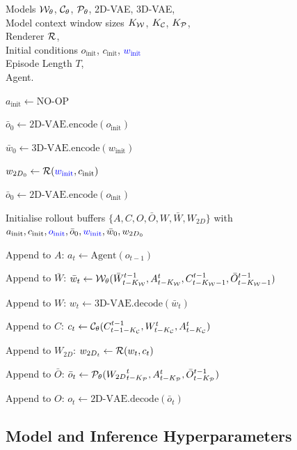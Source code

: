 \documentclass{article}
\theoremstyle{plain}
\theoremstyle{definition}
\theoremstyle{remark}
\newcommand{\ColorState}[2]{\State {\color{#1}#2}}
\newlength{\algleftcol}
\newcommand{\AlgLeftBox}[1]{%
  \parbox[t]{\algleftcol}{\raggedright\strut\ignorespaces#1\unskip\strut}%
}
\let\OldState\State
\renewcommand{\State}[1]{%
  \OldState \AlgLeftBox{#1}%
}
\newcommand{\Input}[1]{%
  \Require \parbox[t]{\algleftcol}{\raggedright #1}%
}
\renewcommand{\Input}[1]{%
  \Require \AlgLeftBox{#1}%
}
\begin{document}
\begin{algorithm}[htb!]
\centering
\caption{PERSIST$+w_0$ inference logic. \textcolor{blue}{Changes to  in blue.}}\label{alg:PERSIST-w0}
\begin{algorithmic}[1]
\Input{Models ${\mathcal{W}}_\theta$, ${\mathcal{C}}_\theta$, ${\mathcal{P}}_\theta$, 2D-VAE, 3D-VAE, \\ Model context window sizes $K_{{\mathcal{W}}}$, $K_{{\mathcal{C}}}$, $K_{{\mathcal{P}}}$, \\ 
Renderer ${\mathcal{R}}$, \\
Initial conditions $o_\text{init}$, $c_\text{init}$, \textcolor{blue}{$w_\text{init}$} \\
Episode Length $T$, \\
Agent.}
\State{$a_\text{init}\leftarrow \text{NO-OP}$} 
\State{$\bar{o}_0 \leftarrow \text{2D-VAE.encode}(o_\text{init})$}
\ColorState{blue}{$\bar{w}_0 \leftarrow \text{3D-VAE.encode}(w_\text{init})$}
\State{$w_{{2D}_0} \leftarrow {\mathcal{R}}(\textcolor{blue}{w_\text{init}},c_\text{init})$}
\ColorState{blue}{$\bar{o}_0 \leftarrow \text{2D-VAE.encode}(o_\text{init})$}
\State{Initialise rollout buffers $\{A,C,O,\bar{O},W,\bar{W},W_{2D}\}$ with $a_\text{init},c_\text{init},\textcolor{blue}{o_\text{init}},\bar{o}_0,\textcolor{blue}{w_\text{init}},\bar{w}_0,w_{{2D}_0}$} 
\State{Append to $A$: $a_t \leftarrow \text{Agent}(o_{t-1})$}
\State{Append to $\bar{W}$: $\bar{w}_t \leftarrow {\mathcal{W}}_\theta(\bar{W}^{t-1}_{t-K_{\mathcal{W}}}, A^t_{t-K_{\mathcal{W}}}, C^{t-1}_{t-K_{\mathcal{W}}-1}, \bar{O}^{t-1}_{t-K_{\mathcal{W}}-1})$}
\State{Append to $W$: $w_t \leftarrow \text{3D-VAE.decode}(\bar{w}_t)$}
\State{Append to $C$: $c_t \leftarrow {\mathcal{C}}_\theta (C^{t-1}_{t-1-K_{\mathcal{C}}}, W^t_{t-K_{\mathcal{C}}}, A^t_{t-K_{\mathcal{C}}})$}
\State{Append to $W_{2D}$: $w_{{2D}_t} \leftarrow {\mathcal{R}}(w_t,c_t)$}
\State{Append to $\bar{O}$: $\bar{o}_t \leftarrow {\mathcal{P}}_\theta ({W_{2D}}_{t-K_{\mathcal{P}}}^{t}, A^t_{t-K_{\mathcal{P}}}, \bar{O}^{t-1}_{t-K_{\mathcal{P}}})$}
\State{Append to $O$: $o_t \leftarrow \text{2D-VAE.decode}(\bar{o}_t)$}
\EndFor
\end{algorithmic}
\end{algorithm}

\clearpage

\subsection{Model and Inference Hyperparameters}
\end{document}
